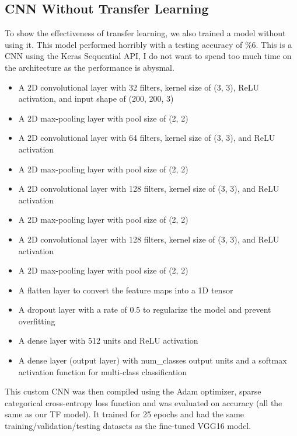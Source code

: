 \documentclass[12pt]{article}
\begin{document}
\subsection{CNN Without Transfer Learning}
To show the effectiveness of 
transfer learning, we also trained a model without using it. This model performed horribly with a testing accuracy of \%6. This is a CNN using the Keras Sequential API, I do not want to spend too much time on the 
architecture as the performance is abysmal.
\begin{itemize}
    \item A 2D convolutional layer with 32 filters, kernel size of (3, 3), ReLU activation, and input shape of (200, 200, 3)
    \item A 2D max-pooling layer with pool size of (2, 2)
    \item A 2D convolutional layer with 64 filters, kernel size of (3, 3), and ReLU activation
    \item A 2D max-pooling layer with pool size of (2, 2)
    \item A 2D convolutional layer with 128 filters, kernel size of (3, 3), and ReLU activation
    \item A 2D max-pooling layer with pool size of (2, 2)
    \item A 2D convolutional layer with 128 filters, kernel size of (3, 3), and ReLU activation
    \item A 2D max-pooling layer with pool size of (2, 2)
    \item A flatten layer to convert the feature maps into a 1D tensor
    \item A dropout layer with a rate of 0.5 to regularize the model and prevent overfitting
    \item A dense layer with 512 units and ReLU activation
    \item A dense layer (output layer) with num\_classes output units and a softmax activation function for multi-class classification
\end{itemize} 
This custom CNN was then compiled using the Adam optimizer, sparse categorical cross-entropy loss function and was evaluated on accuracy (all the same as our TF model).
It trained for 25 epochs and had the same training/validation/testing datasets as the fine-tuned VGG16 model.\\
\end{document}
